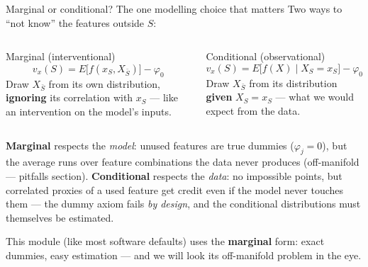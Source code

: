 \documentclass[aspectratio=169,11pt]{beamer}
\begin{document}
\begin{frame}{Marginal or conditional? The one modelling choice that matters}
  \scriptsize
  Two ways to ``not know'' the features outside $S$:
  \begin{columns}[T]
    \begin{block}{Marginal (interventional)}
      \[ v_x(S) = E\bigl[f(x_S, X_{\bar S})\bigr] - \varphi_0 \]
      Draw $X_{\bar S}$ from its own distribution, \textbf{ignoring} its
      correlation with $x_S$ --- like an intervention on the model's inputs.
    \end{block}
    \begin{block}{Conditional (observational)}
      \[ v_x(S) = E\bigl[f(X) \mid X_S = x_S\bigr] - \varphi_0 \]
      Draw $X_{\bar S}$ from its distribution \textbf{given} $X_S=x_S$ ---
      what we would expect from the data.
    \end{block}
  \end{columns}
  \vspace{2pt}
  \begin{readme}
    \textbf{Marginal} respects the \emph{model}: unused features are true dummies
    ($\varphi_j=0$), but the average runs over feature combinations the data never
    produces (off-manifold --- pitfalls section). \textbf{Conditional} respects the
    \emph{data}: no impossible points, but correlated proxies of a used feature get
    credit even if the model never touches them --- the dummy axiom fails \emph{by
    design}, and the conditional distributions must themselves be estimated.
  \end{readme}
  \begin{takeaway}
    This module (like most software defaults) uses the \textbf{marginal} form: exact
    dummies, easy estimation --- and we will look its off-manifold problem in the eye.
  \end{takeaway}
\end{frame}
\end{document}
